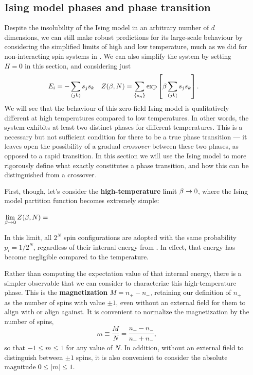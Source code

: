 \subsection{\label{sec:Ising_phases}Ising model phases and phase transition}
Despite the insolubility of the Ising model in an arbitrary number of $d$ dimensions, we can still make robust predictions for its large-scale behaviour by considering the simplified limits of high and low temperature, much as we did for non-interacting spin systems in .
We can also simplify the system by setting $H = 0$ in this section, and considering just
\begin{align}
  \label{eq:Ising_zero_field}
  E_i & = -\sum_{(jk)} s_j s_k &
  Z(\beta, N) & = \sum_{\left\{s_n\right\}} \exp\left[\beta\sum_{(jk)} s_j s_k\right].
\end{align}
We will see that the behaviour of this zero-field Ising model is qualitatively different at high temperatures compared to low temperatures.
In other words, the system exhibits at least two distinct phases for different temperatures.
This is a necessary but not sufficient condition for there to be a true phase transition --- it leaves open the possibility of a gradual \textit{crossover} between these two phases, as opposed to a rapid transition.
In this section we will use the Ising model to more rigorously define what exactly constitutes a phase transition, and how this can be distinguished from a crossover.

First, though, let's consider the \textbf{high-temperature} limit $\beta \to 0$, where the Ising model partition function becomes extremely simple:
\begin{mdframed}
  $\displaystyle \lim_{\beta \to 0} Z(\beta, N) = $ \\[40 pt]
\end{mdframed}
In this limit, all $2^N$ spin configurations are adopted with the same probability $p_i = 1 / 2^N$, regardless of their internal energy from .
In effect, that energy has become negligible compared to the temperature.

Rather than computing the expectation value of that internal energy, there is a simpler observable that we can consider to characterize this high-temperature phase.
This is the \textbf{magnetization} $M = n_+ - n_-$, retaining our definition of $n_{\pm}$ as the number of spins with value $\pm 1$, even without an external field for them to align with or align against.
It is convenient to normalize the magnetization by the number of spins,
\begin{equation}
  \label{eq:Ising_magnet}
  m \equiv \frac{M}{N} = \frac{n_+ - n_-}{n_+ + n_-},
\end{equation}
so that $-1 \leq m \leq 1$ for any value of $N$.
In addition, without an external field to distinguish between $\pm 1$ spins, it is also convenient to consider the absolute magnitude $0 \leq |m| \leq 1$.

